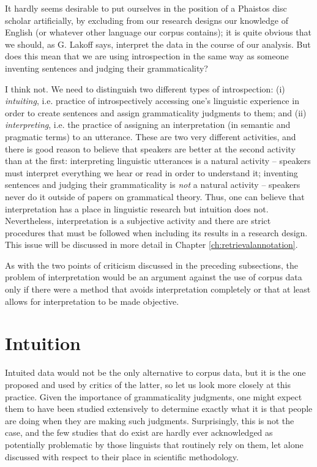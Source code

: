 It hardly seems desirable to put ourselves in the position of a Phaistos disc scholar artificially, by excluding from our research designs our knowledge of English (or whatever other language our corpus contains); it is quite obvious that we should, as G. Lakoff says, interpret the data in the course of our analysis. But does this mean that we are using introspection in the same way as someone inventing sentences and judging their grammaticality?

I think not. We need to distinguish two different types of introspection: (i) \emph{intuiting}, i.e. practice of introspectively accessing one's linguistic experience in order to create sentences and assign grammaticality judgments to them; and (ii) \emph{interpreting}, i.e. the practice of assigning an interpretation (in semantic and pragmatic terms) to an utterance. These are two very different activities, and there is good reason to believe that speakers are better at the second activity than at the first: interpreting linguistic utterances is a natural activity -- speakers must interpret everything we hear or read in order to understand it; inventing sentences and judging their grammaticality is \emph{not} a natural activity -- speakers never do it outside of papers on grammatical theory. Thus, one can believe that interpretation has a place in linguistic research but intuition does not. Nevertheless, interpretation is a subjective activity and there are strict procedures that must be followed when including its results in a research design. This issue will be discussed in more detail in Chapter \ref{ch:retrievalannotation}.

As with the two points of criticism discussed in the preceding subsections, the problem of interpretation would be an argument against the use of corpus data only if there were a method that avoids interpretation completely or that at least allows for interpretation to be made objective.

\section{Intuition}
\label{sec:intuition}

Intuited data would not be the only alternative to corpus data, but it is the one proposed and used by critics of the latter, so let us look more closely at this practice. Given the importance of grammaticality judgments, one might expect them to have been studied extensively to determine exactly what it is that people are doing when they are making such judgments. Surprisingly, this is not the case, and the few studies that do exist are hardly ever acknowledged as potentially problematic by those linguists that routinely rely on them, let alone discussed with respect to their place in scientific methodology.


